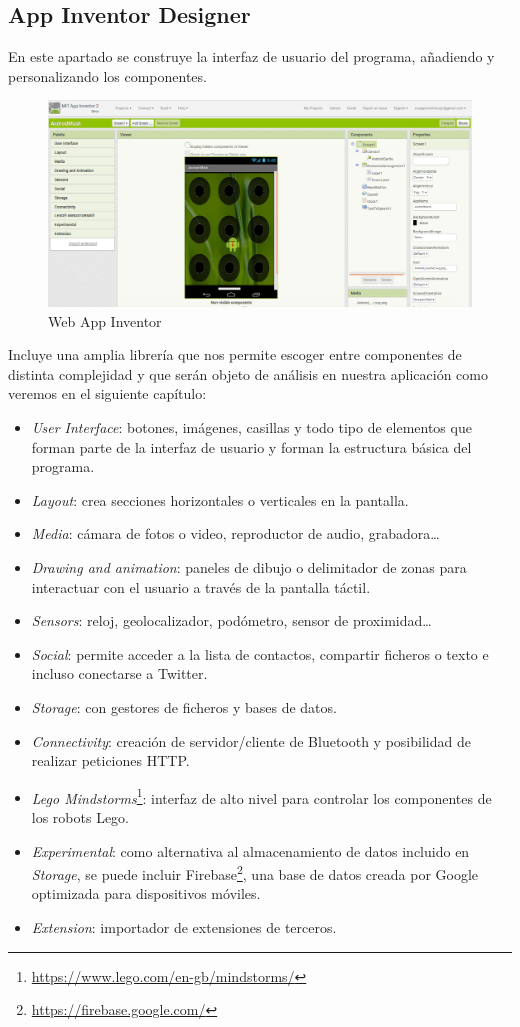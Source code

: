 \documentclass[a4paper, 12pt]{book}
\begin{document}
\subsection{App Inventor Designer} 
En este apartado se construye la interfaz de usuario del programa, añadiendo y personalizando los componentes. 
\begin{figure}[H]
  \centering
  \includegraphics[width=\linewidth, keepaspectratio]{img/appDesigner}
  \caption{Web App Inventor}
  \label{fig:appinventorgallery}
\end{figure}
Incluye una amplia librería que nos permite escoger entre componentes de distinta complejidad y que serán objeto de análisis en nuestra aplicación como veremos en el siguiente capítulo:
\begin{itemize}		
\item \textit{User Interface}: botones, imágenes, casillas y todo tipo de elementos que forman parte de la interfaz de usuario y forman la estructura básica del programa.
\item \textit{Layout}: crea secciones horizontales o verticales en la pantalla. 
\item \textit{Media}: cámara de fotos o video, reproductor de audio, grabadora\ldots 
\item \textit{Drawing and animation}: paneles de dibujo o delimitador de zonas para interactuar con el usuario a través de la pantalla táctil.
\item \textit{Sensors}:	reloj, geolocalizador, podómetro, sensor de proximidad\ldots 
\item \textit{Social}: permite acceder a la lista de contactos, compartir ficheros o texto e incluso conectarse a Twitter. 
\item \textit{Storage}:	con gestores de ficheros y bases de datos.
\item \textit{Connectivity}: creación de servidor/cliente de Bluetooth y posibilidad de realizar peticiones HTTP.	
\item \textit{Lego Mindstorms}\footnote{\url{https://www.lego.com/en-gb/mindstorms/}}: interfaz de alto nivel para controlar los componentes de los robots Lego.
\item \textit{Experimental}: como alternativa al almacenamiento de datos incluido en \textit{Storage}, se puede incluir Firebase\footnote{\url{https://firebase.google.com/}}, una base de datos creada por Google optimizada para dispositivos móviles.
\item \textit{Extension}: importador de extensiones de terceros. 
\end{itemize}
\end{document}
